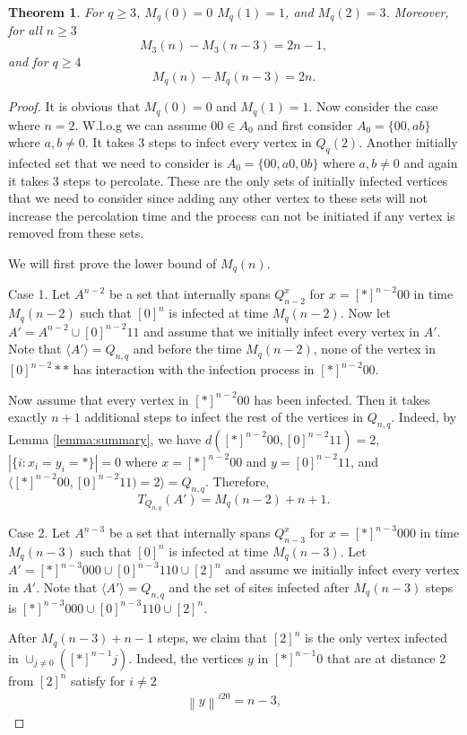 \documentclass[reqno,11pt]{amsart}
\newtheorem{theorem}{Theorem}
\renewcommand{\geq}{\geqslant}
\begin{document}
\begin{theorem}
For $q \geq 3$, $M_q(0)=0$ $M_q(1)=1$, and $M_q(2)=3$. Moreover,  for all $n \geq 3$
$$M_3(n)-M_3(n-3)=2n-1,$$
and for $q \geq 4$
$$M_q(n)-M_q(n-3)=2n.$$
\end{theorem}
\begin{proof}
It is obvious that $M_{q}(0)=0$ and $M_q(1)=1$. Now consider the case where $n=2$. W.l.o.g we can assume $00 \in A_0$ and first consider $A_0=\{00,ab\}$ where $a, b\neq 0$. It takes 3 steps to infect every vertex in $Q_q(2)$. Another initially infected set that we need to consider is $A_{0}=\{00,a0,0b\}$ where $a,b \neq 0$ and again it takes 3 steps to percolate. These are the only sets of initially infected vertices that we need to consider since adding any other vertex to these sets will not increase the percolation time and the process can not be initiated if any vertex is removed from these sets. 

We will first prove the lower bound of $M_{q}(n)$. 

Case 1. Let $A^{n-2}$ be a set that internally spans $Q^x_{n-2}$ for $x=[\ast]^{n-2}00$ in time $M_q(n-2)$ such that $[0]^n$ is infected at time $M_q(n-2)$. Now let $A'=A^{n-2} \cup [0]^{n-2}11$ and assume that we initially infect every vertex in $A'$. Note that $\langle A' \rangle=Q_{n,q}$ and before the time $M_q(n-2)$, none of the vertex in $[0]^{n-2}\ast \ast$ has interaction with the infection process in $[\ast]^{n-2}00$. 

Now assume that every vertex in $[\ast]^{n-2}00$ has been infected. Then it takes exactly $n+1$ additional steps to infect the rest of the vertices in $Q_{n,q}$. Indeed, by Lemma \ref{lemma:summary}, we have $d([\ast]^{n-2}00, [0]^{n-2}11)=2$, $|\{i:x_i=y_i=\ast\}|=0$ where $x=[\ast]^{n-2}00$ and $y=[0]^{n-2}11$, and $\langle [\ast]^{n-2}00, [0]^{n-2}11)=2\rangle= Q_{n,q}$. Therefore, 
$$T_{Q_{n,q}}(A')=M_q(n-2)+n+1.$$

Case 2. Let $A^{n-3}$ be a set that internally spans $Q_{n-3}^x$ for $x=[\ast]^{n-3}000$ in time $M_q(n-3)$ such that $[0]^n$ is infected at time $M_q(n-3)$. Let $A'=[\ast]^{n-3}000 \cup [0]^{n-3}110 \cup [2]^n$ and assume we initially infect every vertex in $A'$. Note that 
$\langle A' \rangle=Q_{n,q}$ and the set of sites infected after $M_q(n-3)$ steps is $[\ast]^{n-3}000 \cup [0]^{n-3}110 \cup [2]^n$.

After $M_q(n-3)+n-1$ steps, we claim that $[2]^n$ is the only vertex infected in $\cup_{j \neq 0} ([\ast]^{n-1}j)$. Indeed, the vertices $y$ in $[\ast]^{n-1}0$ that are at distance 2 from $[2]^n$ satisfy for $i \neq 2$ 
\begin{align} \label{eq:j20}
\left \lVert y \right \rVert^{i20}= n-3,  
\end{align} 


\end{proof}
\end{document}
